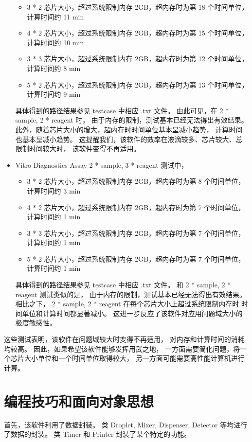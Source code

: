 \documentclass[UTF8, a4paper, titlepage]{ctexart}
\begin{document}
\begin{itemize}
	      \begin{itemize}
		      \item 3 * 2 芯片大小，超过系统限制内存 2GB，超内存时为第 18 个时间单位，计算时间约 11 min
		      \item 4 * 2 芯片大小，超过系统限制内存 2GB，超内存时为第 15 个时间单位，计算时间约 10 min
		      \item 3 * 3 芯片大小，超过系统限制内存 2GB，超内存时为第 12 个时间单位，计算时间约 8 min
		      \item 5 * 2 芯片大小，超过系统限制内存 2GB，超内存时为第 13 个时间单位，计算时间约 9 min
	      \end{itemize}
	      具体得到的路径结果参见 testcase 中相应 .txt 文件。%
	      由此可见，在 2 * sample, 2 * reagent 时，%
	      由于内存的限制，测试基本已经无法得出有效结果。%
	      此外，随着芯片大小的增大，超内存时时间单位基本呈减小趋势，%
	      计算时间也基本呈减小趋势。%
	      这提醒我们，该软件的效率在液滴较多、芯片较大、总限制时间较大时，%
	      该软件变得不再适用。%
	\item Vitro Diagnostics Assay 2 * sample, 3 * reagent 测试中，%
	      \begin{itemize}
		      \item 3 * 2 芯片大小，超过系统限制内存 2GB，超内存时为第 8 个时间单位，计算时间约 3 min
		      \item 4 * 2 芯片大小，超过系统限制内存 2GB，超内存时为第 7 个时间单位，计算时间约 1 min
		      \item 3 * 3 芯片大小，超过系统限制内存 2GB，超内存时为第 7 个时间单位，计算时间约 1 min
		      \item 5 * 2 芯片大小，超过系统限制内存 2GB，超内存时为第 7 个时间单位，计算时间约 1 min
	      \end{itemize}
	      具体得到的路径结果参见 testcase 中相应 .txt 文件。%
	      和 2 * sample, 2 * reagent 测试类似的是，%
	      由于内存的限制，测试基本已经无法得出有效结果。%
	      相比之下， 2 * sample, 2 * reagent 在每个芯片大小上超过系统限制内存时%
	      时间单位和计算时间都显著减小。%
	      这进一步反应了该软件对应用问题域大小的极度敏感性。
\end{itemize}
这些测试表明，该软件在问题域较大时变得不再适用，%
对内存和计算时间的消耗均较高。%
因此，如果希望该软件能够发挥用武之地，%
一方面需要简化问题，将一个芯片大小单位和一个时间单位取得较大，%
另一方面可能需要高性能计算机进行计算。%

\section{编程技巧和面向对象思想}
首先，该软件利用了数据封装。%
类 Droplet, Mixer, Dispenser, Detector 等均进行了数据的封装。%
类 Timer 和 Printer 封装了某个特定的功能。%
\end{document}
